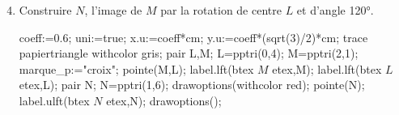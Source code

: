 \begin{corrige}
\begin{enumerate}
    \end{enumerate}
    \Coupe
    \begin{enumerate}
        \setcounter{enumi}{3}
        \item Construire $N$, l'image de $M$ par la rotation de centre $L$ et d'angle \ang{120}.\\
        \begin{Geometrie}[CoinHD={(3u,4u)}]
            coeff:=0.6;
            uni:=true;
            x.u:=coeff*cm;
            y.u:=coeff*(sqrt(3)/2)*cm;
            trace papiertriangle withcolor gris;
            pair L,M;
            L=pptri(0,4);
            M=pptri(2,1);
            marque_p:="croix";
            pointe(M,L);
            label.lft(btex $M$ etex,M);
            label.lft(btex $L$ etex,L);	
            pair N;
            N=pptri(1,6);
            drawoptions(withcolor red);
            pointe(N);
            label.ulft(btex $N$ etex,N);	 
            drawoptions();
        \end{Geometrie}
    \end{enumerate}
\end{corrige}

